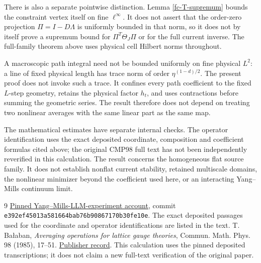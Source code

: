 \documentclass[11pt]{article}
\theoremstyle{remark}
\begin{document}
There is also a separate pointwise distinction. Lemma
\ref{fc-T-supremum} bounds the constraint vertex itself on fine
$\ell^\infty$. It does not assert that the order-zero projection
$\Pi=I-D\Lambda$ is uniformly bounded in that norm, so it does not
by itself prove a supremum bound for $\Pi^T\Theta_J\Pi$ or for the
full current inverse. The full-family theorem above uses physical
cell Hilbert norms throughout.

A macroscopic path integral need not be bounded uniformly on fine
physical $L^2$: a line of fixed physical length has trace norm of
order $\eta^{(1-d)/2}$. The present proof does not invoke such a
trace. It confines every path coefficient to the fixed $L$-step
geometry, retains the physical factor $h_t$, and uses contractions
before summing the geometric series. The result therefore does not
depend on treating two nonlinear averages with the same linear
part as the same map.

The mathematical estimates have separate internal checks. The
operator identification uses the exact deposited coordinate,
composition and coefficient formulas cited above; the original
CMP98 full text has not been independently reverified in this
calculation. The result concerns the homogeneous flat source
family. It does not establish nonflat current stability, retained
multiscale domains, the nonlinear minimizer beyond the coefficient
used here, or an interacting Yang--Mills continuum limit.

\begin{thebibliography}{9}
\href{https://github.com/ethanwsussman/Yang--Mills-LLM-experiment/tree/e392ef45013a581664bab76b90867170b30fe10e}
{Pinned Yang--Mills-LLM-experiment account}, commit
\texttt{e392ef45013a581664bab76b90867170b30fe10e}.
The exact deposited passages used for the coordinate and operator
identifications are listed in the text.
T. Ba\l aban, \emph{Averaging operations for lattice gauge theories},
Commun. Math. Phys. 98 (1985), 17--51.
\href{https://doi.org/10.1007/BF01211042}{Publisher record}.
This calculation uses the pinned deposited transcriptions; it does not
claim a new full-text verification of the original paper.
\end{thebibliography}
\end{document}
